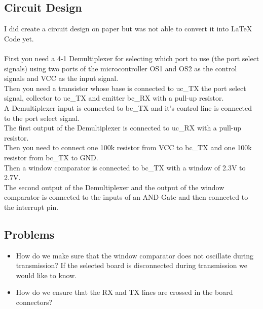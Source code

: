 \pagebreak

\subsection{Circuit Design}

I did create a circuit design on paper but was not able to convert it into LaTeX Code yet.\\
\\
\noindent First you need a 4-1 Demultiplexer for selecting which port to use (the port select signals) using two ports of the microcontroller OS1 and OS2 as the control signals and VCC as the input signal.\\
Then you need a transistor whose base is connected to uc\_TX the port select signal, collector to uc\_TX and emitter bc\_RX with a pull-up resistor.\\
A Demultiplexer input is connected to bc\_TX and it's control line is connected to the port select signal.\\
The first output of the Demultiplexer is connected to uc\_RX with a pull-up resistor.\\
Then you need to connect one 100k resistor from VCC to bc\_TX and one 100k resistor from bc\_TX to GND.\\
Then a window comparator is connected to bc\_TX with a window of 2.3V to 2.7V.\\
The second output of the Demultiplexer and the output of the window comparator is connected to the inputs of an AND-Gate and then connected to the interrupt pin.

\iffalse
\begin{figure}[!ht]
    \centering
    \begin{circuitikz}
    \end{circuitikz}

    \label{circ:UART_Multiplexing}
\end{figure}
\fi

\subsection{Problems}

\begin{itemize}
  \item How do we make sure that the window comparator does not oscillate during transmission? 
      If the selected board is disconnected during transmission we would like to know.\\
  \item How do we ensure that the RX and TX lines are crossed in the board connectors?
\end{itemize}


